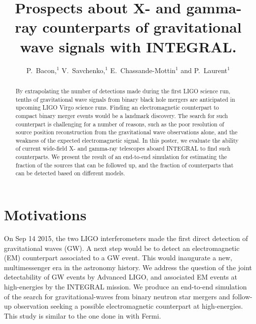 \documentclass[11pt]{article}
\begin{document}
\title{Prospects about X- and gamma-ray counterparts of gravitational wave signals with INTEGRAL.}
\author{P.~Bacon,$^1$ V.~Savchenko,$^1$ E.~Chassande-Mottin$^1$ and P.~Laurent$^1$}


\begin{abstract}
	By extrapolating the number of detections made during the first
   	LIGO science run, tenths of gravitational wave signals from binary
   	black hole mergers are anticipated in upcoming LIGO Virgo science
   	runs. Finding an electromagnetic counterpart to compact binary
   	merger events would be a landmark discovery. The search for such
   	counterpart is challenging for a number of reasons, such as the
   	poor resolution of source position reconstruction from the
   	gravitational wave observations alone, and the weakness of the
   	expected electromagnetic signal. In this poster, we evaluate the
   	ability of current wide-field X- and gamma-ray telescopes aboard
   	INTEGRAL to find such counterparts. We present the result of an
   	end-to-end simulation for estimating the fraction of the sources
   	that can be followed up, and the fraction of counterparts that can
   	be detected based on different models.
\end{abstract}
 
\section*{Motivations}

On Sep 14 2015, the two LIGO interferometers made the first direct detection of
gravitational waves (GW). A next step would be to detect an electromagnetic (EM)
counterpart associated to a GW event. This would inaugurate a new,
multimessenger era in the astronomy history. We address the question of the
joint detectability of GW events by Advanced LIGO, and
associated EM events at high-energies by the INTEGRAL mission. We produce an
end-to-end simulation of the search for gravitational-waves from binary
neutron star mergers and follow-up observation seeking a possible
electromagnetic counterpart at high-energies. This study is similar to the
one done in \citep{2016arXiv160606124P} with Fermi.
\end{document}
